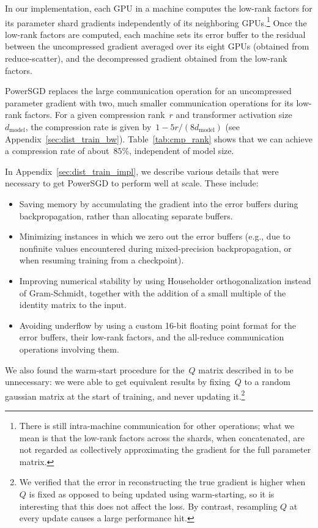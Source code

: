 \documentclass{article}
\begin{document}
In our implementation, each GPU in a machine computes the low-rank factors for its parameter shard gradients independently of its neighboring GPUs.\footnote{There is still intra-machine communication for other operations; what we mean is that the low-rank factors across the shards, when concatenated, are not regarded as collectively approximating the gradient for the full parameter matrix.} Once the low-rank factors are computed, each machine sets its error buffer to the residual between the uncompressed gradient averaged over its eight GPUs (obtained from reduce-scatter), and the decompressed gradient obtained from the low-rank factors.

PowerSGD replaces the large communication operation for an uncompressed parameter gradient with two, much smaller communication operations for its low-rank factors. For a given compression rank~$r$ and transformer activation size~$d_\mathrm{model}$, the compression rate is given by~$1 - 5 r / (8 d_\textrm{model})$ (see Appendix~\ref{sec:dist_train_bw}). Table~\ref{tab:cmp_rank} shows that we can achieve a compression rate of about~$85\%$, independent of model size.

In Appendix~\ref{sec:dist_train_impl}, we describe various details that were necessary to get PowerSGD to perform well at scale. These include:
\begin{itemize}
    \item Saving memory by accumulating the gradient into the error buffers during backpropagation, rather than allocating separate buffers.
    \item Minimizing instances in which we zero out the error buffers (e.g., due to nonfinite values encountered during mixed-precision backpropagation, or when resuming training from a checkpoint).
    \item Improving numerical stability by using Householder orthogonalization instead of Gram-Schmidt, together with the addition of a small multiple of the identity matrix to the input.
    \item Avoiding underflow by using a custom 16-bit floating point format for the error buffers, their low-rank factors, and the all-reduce communication operations involving them.
\end{itemize}
We also found the warm-start procedure for the~$Q$ matrix described in \citet{vogels2019powersgd} to be unnecessary: we were able to get equivalent results by fixing~$Q$ to a random gaussian matrix at the start of training, and never updating it.\footnote{We verified that the error in reconstructing the true gradient is higher when~$Q$ is fixed as opposed to being updated using warm-starting, so it is interesting that this does not affect the loss. By contrast, resampling $Q$ at every update causes a large performance hit.}
\end{document}
